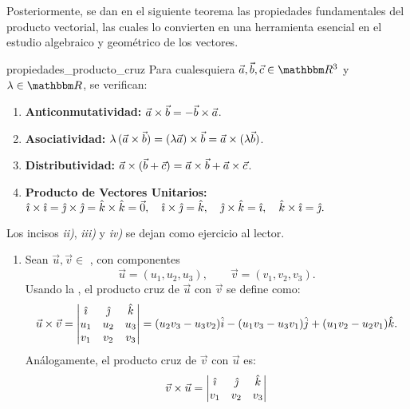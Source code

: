 Posteriormente, se dan en el siguiente teorema las propiedades fundamentales del producto vectorial, las cuales lo convierten en una herramienta esencial en el estudio algebraico y geométrico de los vectores.

\begin{theorem}{}{propiedades_producto_cruz}
    Para cualesquiera $\veca, \vecb, \vecc \in \RR[3]$ y $\lambda \in \RR$, se verifican:
    \begin{enumerate}[label=\textit{\roman*)}]
        \item \textbf{Anticonmutatividad:} $\veca \times \vecb = -\vecb \times \veca$.
        \item \textbf{Asociatividad:} $\lambda\,(\veca \times \vecb) = (\lambda\veca) \times \vecb = \veca \times (\lambda\vecb)$.
        \item \textbf{Distributividad:} $\veca \times (\vecb + \vecc) = \veca \times \vecb + \veca \times \vecc$.
        \item \textbf{Producto de Vectores Unitarios:} $\veci \times \veci = \vecj \times \vecj = \veck \times \veck = \vecce, \quad \veci \times \vecj = \veck, \quad \vecj \times \veck = \veci, \quad \veck \times \veci = \vecj.$
    \end{enumerate}
    \dem Los incisos \textit{\creato\selectfont\color{mainc}ii)}, \textit{\creato\selectfont\color{mainc}iii)} y \textit{\creato\selectfont\color{mainc}iv)} se dejan como ejercicio al lector.
    \begin{enumerate}[label=\textit{\roman*)}]
        \item Sean $\vec{u}, \vec{v} \in$ \RR[3], con componentes
        $$\vec{u} = (u_1, u_2, u_3), \qquad \vec{v} = (v_1, v_2, v_3).$$
        Usando la , el producto cruz de $\vec{u}$ con $\vec{v}$ se define como:
        $$\vec{u} \times \vec{v} = 
        \begin{vmatrix}
            \veci & \vecj & \veck \\
            u_1 & u_2 & u_3 \\
            v_1 & v_2 & v_3
        \end{vmatrix}
        = (u_2v_3 - u_3v_2)\hat{i} - (u_1v_3 - u_3v_1)\hat{j} + (u_1v_2 - u_2v_1)\hat{k}.$$
        Análogamente, el producto cruz de $\vec{v}$ con $\vec{u}$ es:
        $$\vec{v} \times \vec{u} = 
        \begin{vmatrix}
            \veci & \vecj & \veck \\
            v_1 & v_2 & v_3 \\

\end{vmatrix}$$
\end{enumerate}
\end{theorem}
